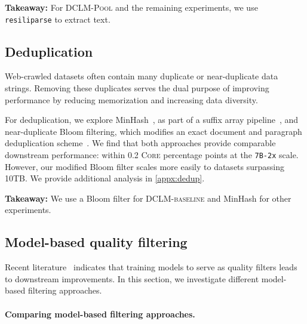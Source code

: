 \begin{tcolorbox}[
    colback=blue!10,
    colframe=blue!50, boxrule=0.5pt, arc=0mm, left=5pt, right=5pt, top=2pt, bottom=2pt,
    fontupper={\fontsize{9.5pt}{11.75pt}\selectfont}
  ]
    \textbf{Takeaway:} For \textsc{DCLM-Pool} and the remaining experiments, we use \texttt{resiliparse} to extract text.
  \end{tcolorbox}

\subsection{Deduplication}
\label{sec:dedup}
Web-crawled datasets often contain many duplicate or near-duplicate data strings. Removing these duplicates serves the dual purpose of improving performance by reducing memorization \citep{carlini2023quantifying, Lee2021DeduplicatingTD} and increasing data diversity.

For deduplication, we explore MinHash~\citep{minhash}, as part of a suffix array pipeline~\citep{Lee2021DeduplicatingTD, refinedweb}, and near-duplicate Bloom filtering, which modifies an exact document and paragraph deduplication scheme~\citep{soldaini2024dolma}. We find that both approaches provide comparable downstream performance: within 0.2 \textsc{Core} percentage points at the \texttt{7B-2x} scale. However, our modified Bloom filter scales more easily to datasets surpassing 10TB. We provide additional analysis in \ref{appx:dedup}.

\begin{tcolorbox}[
    colback=blue!10,
    colframe=blue!50, boxrule=0.5pt, arc=0mm, left=5pt, right=5pt, top=2pt, bottom=2pt,
    fontupper={\fontsize{9.5pt}{11.75pt}\selectfont}
  ]
    \textbf{Takeaway:} We use a Bloom filter for \textsc{DCLM-baseline} and MinHash for other experiments.
  \end{tcolorbox}

\subsection{Model-based quality filtering}
\label{sec:quality_filtering}
Recent literature~\citep{fang2023dfn,soldaini2024dolma, brandfonbrener2024color} indicates that training models to serve as quality filters leads to downstream improvements. In this section, we investigate different model-based filtering approaches.

\paragraph{Comparing model-based filtering approaches.}

